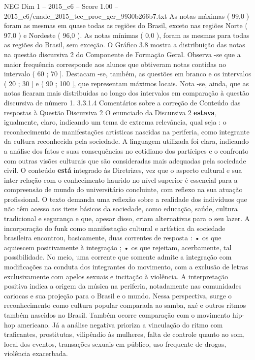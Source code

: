 \begin{textsample}{NEG Dim 1 – 2015\_c6 – Score 1.00 – 2015\_c6/enade\_2015\_tec\_proc\_ger\_9930b266b7.txt}
As notas máximas ( 99,0 ) foram as mesmas em quase todas as regiões do Brasil, exceto nas regiões Norte ( 97,0 ) e Nordeste ( 96,0 ).
As notas mínimas ( 0,0 ), foram as mesmas para todas as regiões do Brasil, sem exceção.
O Gráfico 3.8 mostra a distribuição das notas na questão discursiva 2 do Componente de Formação Geral.
Observa -se que a maior frequência corresponde aos alunos que obtiveram notas contidas no intervalo ( 60 ; 70 ].
Destacam -se, também, as questões em branco e os intervalos ( 20 ; 30 ] e ( 90 ; 100 ], que representam máximos locais.
Nota -se, ainda, que as notas ficaram mais distribuídas ao longo dos intervalos em comparação à questão discursiva de número 1. 3.3.1.4 Comentários sobre a correção de Conteúdo das respostas à Questão Discursiva 2 O enunciado da Discursiva 2 \textbf{estava}, igualmente, claro, indicando um tema de extrema relevância, qual seja : o reconhecimento de manifestações artísticas nascidas na periferia, como integrante da cultura reconhecida pela sociedade.
A linguagem utilizada foi clara, indicando a análise dos fatos e suas consequências no cotidiano dos partícipes e o confronto com outras visões culturais que são consideradas mais adequadas pela sociedade civil.
O conteúdo \textbf{está} integrado às Diretrizes, vez que o aspecto cultural e sua inter-relação com o conhecimento haurido no nível superior é essencial para a compreensão de mundo do universitário concluinte, com reflexo na sua atuação profissional.
O texto demanda uma reflexão sobre a realidade dos indivíduos que não têm acesso aos itens básicos da sociedade, como educação, saúde, cultura tradicional e segurança e que, apesar disso, criam alternativas para o seu lazer.
A incorporação do funk como manifestação cultural e artística da sociedade brasileira encontrou, basicamente, duas correntes de resposta : • os que aquiescem positivamente à integração ; • os que rejeitam, acerbamente, tal possibilidade.
No meio, uma corrente que somente admite a integração com modificações na conduta dos integrantes do movimento, com a exclusão de letras exclusivamente com apelos sexuais e incitação à violência.
A interpretação positiva indica a origem da música na periferia, notadamente nas comunidades cariocas e sua projeção para o Brasil e o mundo.
Nessa perspectiva, surge o reconhecimento como cultura popular comparada ao samba, axé e outros ritmos também nascidos no Brasil.
Também ocorre comparação com o movimento hip-hop americano.
Já a análise negativa prioriza a vinculação do ritmo com traficantes, prostitutas, vilipêndio às mulheres, falta de controle quanto ao som, local dos eventos, transações sexuais em público, uso frequente de drogas, violência exacerbada.

\end{textsample}
